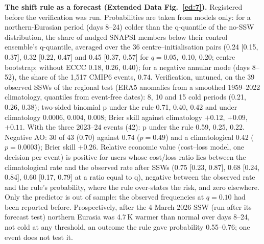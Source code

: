 \documentclass[11pt]{article}
\begin{document}
\textbf{The shift rule as a forecast (Extended Data Fig.~\ref{ed:7}).} Registered before the verification was run. Probabilities are taken from models only: for a northern-Eurasian period (days 8–24) colder than the q-quantile of the no-SSW distribution, the share of nudged SNAPSI members below their control ensemble's q-quantile, averaged over the 36 centre–initialisation pairs (0.24 [0.15, 0.37], 0.32 [0.22, 0.47] and 0.45 [0.37, 0.57] for $q = 0.05,$ 0.10, 0.20; centre bootstrap; without ECCC 0.18, 0.26, 0.40); for a negative annular mode (days 8–52), the share of the 1,517 CMIP6 events, 0.74. Verification, untuned, on the 39 observed SSWs of the regional test (ERA5 anomalies from a smoothed 1959–2022 climatology, quantiles from event-free dates): 8, 10 and 15 cold periods (0.21, 0.26, 0.38); two-sided binomial p under the rule 0.71, 0.40, 0.42 and under climatology 0.0006, 0.004, 0.008; Brier skill against climatology $+0.12$, $+0.09$, $+0.11$. With the three 2023–24 events (42): p under the rule 0.59, 0.25, 0.22. Negative AO: 30 of 43 (0.70) against 0.74 ($p = 0.49$) and a climatological 0.42 ($p = 0.0003$); Brier skill $+0.26$. Relative economic value (cost–loss model, one decision per event) is positive for users whose cost/loss ratio lies between the climatological rate and the observed rate after SSWs (0.75 [0.23, 0.87], 0.68 [0.24, 0.84], 0.60 [0.17, 0.79] at a ratio equal to q), negative between the observed rate and the rule's probability, where the rule over-states the risk, and zero elsewhere. Only the predictor is out of sample: the observed frequencies at $q = 0.10$ had been reported before. Prospectively, after the 4 March 2026 SSW (run after its forecast test) northern Eurasia was 4.7\,K warmer than normal over days 8–24, not cold at any threshold, an outcome the rule gave probability 0.55–0.76; one event does not test it.
\end{document}
